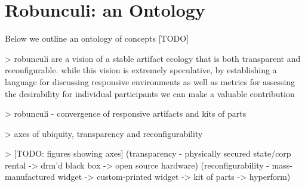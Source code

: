 \section{Robunculi: an Ontology}


Below we outline an ontology of concepts [TODO]

> robunculi are a vision of a stable artifact ecology that is both transparent and reconfigurable. while this vision is extremely speculative, by establishing a language for discussing responsive environments as well as metrics for assessing the desirability for individual participants we can make a valuable contribution


> robunculi - convergence of responsive artifacts and kits of parts

> axes of ubiquity, transparency and reconfigurability

> [TODO: figures showing axes] (transparency - physically secured state/corp rental -> drm'd black box -> open source hardware) (reconfigurability - mass-manufactured widget -> custom-printed widget -> kit of parts -> hyperform)

